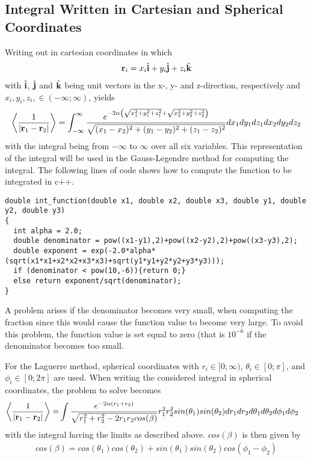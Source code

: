 \subsection{Integral Written in Cartesian and Spherical Coordinates}
\label{subsec:CartesianSpherical}
Writing out  in cartesian coordinates in which
\begin{align}
	\mbox{\textbf{r}}_i = x_i \hat{\mbox{\textbf{i}}} + y_i \hat{\mbox{\textbf{j}}} + z_i \hat{\mbox{\textbf{k}}}
	\label{eq:CartesianSpherical1}
\end{align}
with $\hat{\mbox{\textbf{i}}}$, $\hat{\mbox{\textbf{j}}}$ and $\hat{\mbox{\textbf{k}}}$ being unit vectors in the x-, y- and z-direction, respectively and $x_i, y_i, z_i, \in (-\infty ; \infty )$, yields
\begin{align}
	\left< \frac{1}{| \mbox{\textbf{r}}_1 - \mbox{\textbf{r}}_2 |} \right> 
   = \int _{-\infty } ^{\infty }   
   \frac{e^{-2\alpha \left( \sqrt{x_1^2+y_1^2+z_1^2} + \sqrt{x_2^2+y_2^2+z_2^2}\right) }}{\sqrt{(x_1-x_2)^2+(y_1-y_2)^2+(z_1-z_2)^2}} d x_1 d y_1 d z_1 d x_2 d y_2 d z_2
   \label{eq:CartesianSpherical2}
\end{align}
with the integral being from $-\infty$ to $\infty$ over all six variables.
This representation of the integral will be used in the Gauss-Legendre method for computing the integral.
The following lines of code shows how to compute the function to be integrated in c++.
\begin{lstlisting}
double int_function(double x1, double x2, double x3, double y1, double y2, double y3)
{
  int alpha = 2.0;
  double denominator = pow((x1-y1),2)+pow((x2-y2),2)+pow((x3-y3),2);
  double exponent = exp(-2.0*alpha*(sqrt(x1*x1+x2*x2+x3*x3)+sqrt(y1*y1+y2*y2+y3*y3)));
  if (denominator < pow(10,-6)){return 0;}
  else return exponent/sqrt(denominator);
}
\end{lstlisting}
A problem arises if the denominator becomes very small, when computing the fraction since this would cause the function value to become very large. 
To avoid this problem, the function value is set equal to zero (that is $10^{-6}$ if the denominator becomes too small.

For the Laguerre method, spherical coordinates with 
$r_i \in [0;\infty )$, 
$\theta_i \in [0;\pi]$, and 
$\phi_i \in [0;2\pi]$ are used.
When writing the considered integral in spherical coordinates, the problem to solve becomes 
\begin{align}
	\left< \frac{1}{| \mbox{\textbf{r}}_1 - \mbox{\textbf{r}}_2 |} \right> 
   = &\int  
   \frac{e^{-2\alpha (r_1 + r_2 )}}{\sqrt{r_1^2 + r_2 ^2 -2 r_1 r_2 cos(\beta)}}  
r_1 ^2 r_2 ^2 sin(\theta_1 ) sin(\theta_2 ) 
	dr_1 dr_2 d\theta_1 d\theta_2 d\phi_1 d\phi_2    
   \label{eq:CartesianSpherical3}
\end{align}
with the integral having the limits as described above.
$cos(\beta )$ is then given by
\begin{align}
	cos(\beta) = cos(\theta_1) cos(\theta_2) + sin(\theta_1) sin(\theta_2 ) cos(\phi_1 - \phi_2 )
	\label{eq:CartesianSpherical4}
\end{align}
